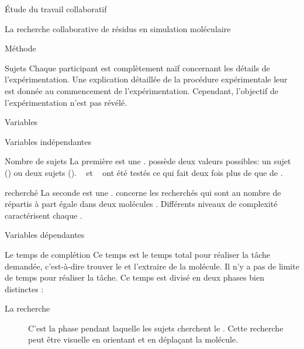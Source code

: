 \documentclass[myfrancais]{mythesis}
\begin{document}
\begin{mypart}{Étude du travail collaboratif}
\begin{mychapter}{La recherche collaborative de résidus en simulation moléculaire}
\begin{mysection}{Méthode}
\begin{mysubsection}{Sujets}
					Chaque participant est complètement naïf concernant les détails de l'expérimentation.
					Une explication détaillée de la procédure expérimentale leur est donnée au commencement de l'expérimentation.
					Cependant, l'objectif de l'expérimentation n'est pas révélé.
				\end{mysubsection}
				\begin{mysubsection}{Variables}
					\begin{mysubsubsection}{Variables indépendantes}
						\begin{myparagraph}{ Nombre de sujets}
							La première  est une .
							 possède deux valeurs possibles: \og un sujet \fg (\mycf {}) ou \og deux sujets \fg (\mycf {}).
							~ et ~ ont été testés ce qui fait deux fois plus de  que de .
						\end{myparagraph}
						\begin{myparagraph}{  recherché}
							La seconde  est une .
							 concerne les  recherchés qui sont au nombre de  répartis à part égale dans deux molécules .
							Différents niveaux de complexité caractérisent chaque  .
						\end{myparagraph}
					\end{mysubsubsection}
					\begin{mysubsubsection}{Variables dépendantes}
						\begin{myparagraph}{ Le temps de complétion}
							Ce temps est le temps total pour réaliser la tâche demandée, c'est-à-dire trouver le  et l'extraire de la molécule.
							Il n'y a pas de limite de temps pour réaliser la tâche.
							Ce temps est divisé en deux phases bien distinctes :
							\begin{description}
								\item[La recherche] C'est la phase pendant laquelle les sujets cherchent le .
									Cette recherche peut être visuelle en orientant et en déplaçant la molécule.

\end{description}
\end{myparagraph}
\end{mysubsubsection}
\end{mysubsection}
\end{mysection}
\end{mychapter}
\end{mypart}
\end{document}

